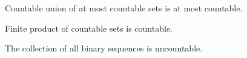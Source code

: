\documentclass[a4paper]{report}
\begin{document}
\begin{eg}
    
\end{eg}

\begin{eg}[\( \Q  \) is countable]
    
\end{eg}

\begin{theorem}[ ]
   Countable union of at most countable sets is at most countable.
\end{theorem}

\begin{corollary}
    
\end{corollary}

\begin{corollary}
    
\end{corollary}

\begin{theorem}[ ]
   Finite product of countable sets is countable. 
\end{theorem}

\begin{eg}[\( \Q \) is countable]
    
\end{eg}

\begin{theorem}[ ]
   The collection of all binary sequences is uncountable. 
\end{theorem}
\end{document}
